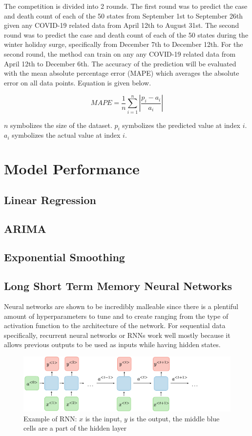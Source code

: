 \documentclass[sigconf,nonacm]{acmart}
\begin{document}
The competition is divided into 2 rounds. The first round was to predict the case and death count of each of the 50 states from September 1st to September 26th given any COVID-19 related data from April 12th to August 31st. The second round was to predict the case and death count of each of the 50 states during the winter holiday surge, specifically from December 7th to December 12th. For the second round, the method can train on any any COVID-19 related data from April 12th to December 6th. 
The accuracy of the prediction will be evaluated with the mean absolute percentage error (MAPE) which averages the absolute error on all data points. Equation is given below.

$$MAPE = \frac{1}{n} \sum_{i = 1}^{n} |\frac{p_i - a_i}{a_i} |$$

$n$ symbolizes the size of the dataset. $p_i$ symbolizes the predicted value at index $i$. $a_i$ symbolizes the actual value at index $i$.

\section{Model Performance}
\subsection{Linear Regression}
\subsection{ARIMA}
\subsection{Exponential Smoothing}
\subsection{Long Short Term Memory Neural Networks}

Neural networks are shown to be incredibly malleable since there is a plentiful amount of hyperparameters to tune and to create ranging from the type of activation function to the architecture of the network. For sequential data specifically, recurrent neural networks or RNNs work well mostly because it allows previous outputs to be used as inputs while having hidden states. 

\begin{figure}
  \centering
  \includegraphics[width=\linewidth]{figures/architecture-rnn-ltr.png}
  \caption{Example of RNN: $x$ is the input, $y$ is the output, the middle blue cells are a part of the hidden layer}
  \label{fig:rnn}
\end{figure}
\end{document}
